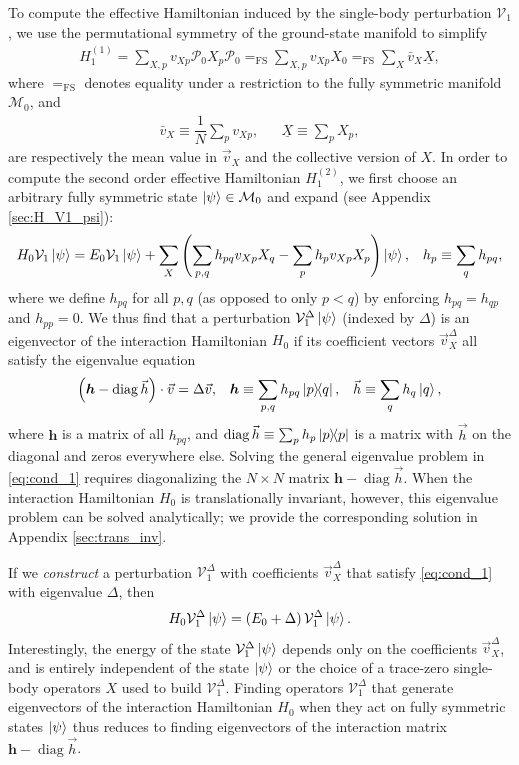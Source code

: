 \documentclass[nofootinbib,notitlepage,11pt]{revtex4-2}
\newcommand{\f}[2]{\dfrac{#1}{#2}} %
\newcommand{\p}[1]{\left(#1\right)} %
\renewcommand{\c}{\cdot} %
\newcommand{\m}{\bm} %
\renewcommand{\v}{\vec} %
\newcommand{\1}{\mathds{1}}
\newcommand{\M}{\mathcal{M}}
\renewcommand{\P}{\mathcal{P}}
\newcommand{\V}{\mathcal{V}}
\newcommand{\EQFS}{=_{\text{FS}}}
\newcommand{\col}{\underline}
\DeclareMathOperator{\diag}{diag}
\begin{document}
To compute the effective Hamiltonian induced by the single-body
perturbation $\V_1$, we use the permutational symmetry of the
ground-state manifold to simplify
\begin{align}
  H_1^{(1)} = \sum_{X,p} v_{Xp} \P_0 X_p \P_0
  \EQFS \sum_{X,p} v_{Xp} X_0
  \EQFS \sum_X \bar v_X \col{X},
  \label{eq:H_1_1}
\end{align}
where $\EQFS$ denotes equality under a restriction to the fully
symmetric manifold $\M_0$, and
\begin{align}
  \bar v_X \equiv \f1N \sum_p v_{Xp},
  &&
  \col{X} \equiv \sum_p X_p,
\end{align}
are respectively the mean value in $\v v_X$ and the collective version
of $X$.  In order to compute the second order effective Hamiltonian
$H_1^{(2)}$, we first choose an arbitrary fully symmetric state
$\ket\psi\in\M_0$ and expand (see Appendix \ref{sec:H_V1_psi}):
\begin{align}
  H_0 \V_1 \ket\psi
  = E_0 \V_1 \ket\psi
  + \sum_X \p{\sum_{p,q} h_{pq} v_{Xp} X_q - \sum_p h_p v_{Xp} X_p}
  \ket\psi,
  &&
  h_p \equiv \sum_q h_{pq},
  \label{eq:H_V1_psi}
\end{align}
where we define $h_{pq}$ for all $p,q$ (as opposed to only $p<q$) by
enforcing $h_{pq}=h_{qp}$ and $h_{pp}=0$.  We thus find that a
perturbation $\V_1^\Delta\ket\psi$ (indexed by $\Delta$) is an
eigenvector of the interaction Hamiltonian $H_0$ if its coefficient
vectors $\v v_X^\Delta$ all satisfy the eigenvalue equation
\begin{align}
  \p{\m h - \diag\v h}\c\v v = \Delta \v v,
  &&
  \m h \equiv \sum_{p,q} h_{pq} \op{p}{q},
  &&
  \v h \equiv \sum_q h_q \ket{q},
  \label{eq:cond_1}
\end{align}
where $\m h$ is a matrix of all $h_{pq}$, and
$\diag\v h\equiv\sum_p h_p \op{p}$ is a matrix with $\v h$ on the
diagonal and zeros everywhere else.  Solving the general eigenvalue
problem in \eqref{eq:cond_1} requires diagonalizing the $N\times N$
matrix $\m h-\diag\v h$.  When the interaction Hamiltonian $H_0$ is
translationally invariant, however, this eigenvalue problem can be
solved analytically; we provide the corresponding solution in Appendix
\ref{sec:trans_inv}.

If we {\it construct} a perturbation $\V_1^\Delta$ with coefficients
$\v v_X^\Delta$ that satisfy \eqref{eq:cond_1} with eigenvalue
$\Delta$, then
\begin{align}
  H_0 \V_1^\Delta \ket\psi = \p{E_0 + \Delta} \V_1^\Delta \ket\psi.
\end{align}
Interestingly, the energy of the state $\V_1^\Delta\ket\psi$ depends
only on the coefficients $\v v_X^\Delta$, and is entirely independent
of the state $\ket\psi$ or the choice of a trace-zero single-body
operators $X$ used to build $\V_1^\Delta$.  Finding operators
$\V_1^\Delta$ that generate eigenvectors of the interaction
Hamiltonian $H_0$ when they act on fully symmetric states $\ket\psi$
thus reduces to finding eigenvectors of the interaction matrix
$\m h-\diag\v h$.
\end{document}
